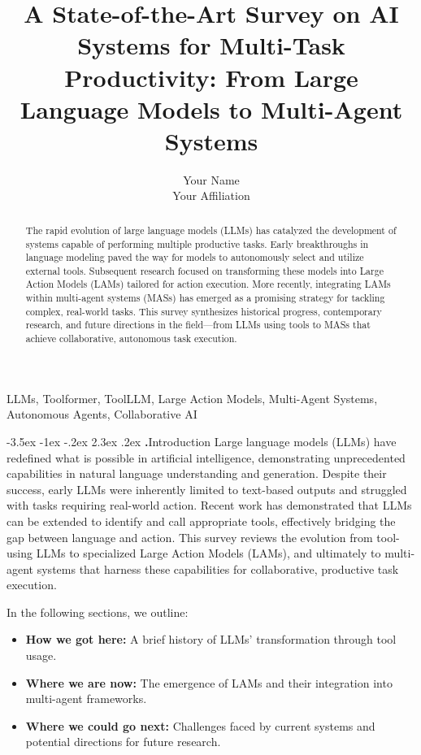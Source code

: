 \documentclass[journal,twoside,10pt]{IEEEtran}
\makeatletter
\renewcommand\section{\@startsection{section}{1}{\z@}%
                       {-3.5ex \@plus -1ex \@minus -.2ex}%
                       {2.3ex \@plus.2ex}%
                       {\normalfont\Large\bfseries\Roman{section}.\quad}}
\makeatother
\begin{document}
\title{A State-of-the-Art Survey on AI Systems for Multi-Task Productivity: From Large Language Models to Multi-Agent Systems}

\author{Your Name \\ Your Affiliation}

\maketitle

\begin{abstract}
The rapid evolution of large language models (LLMs) has catalyzed the development of systems capable of performing multiple productive tasks. Early breakthroughs in language modeling paved the way for models to autonomously select and utilize external tools. Subsequent research focused on transforming these models into Large Action Models (LAMs) tailored for action execution. More recently, integrating LAMs within multi-agent systems (MASs) has emerged as a promising strategy for tackling complex, real-world tasks. This survey synthesizes historical progress, contemporary research, and future directions in the field—from LLMs using tools to MASs that achieve collaborative, autonomous task execution.
\end{abstract}

\begin{IEEEkeywords}
LLMs, Toolformer, ToolLLM, Large Action Models, Multi-Agent Systems, Autonomous Agents, Collaborative AI
\end{IEEEkeywords}

\section{Introduction}
Large language models (LLMs) have redefined what is possible in artificial intelligence, demonstrating unprecedented capabilities in natural language understanding and generation. Despite their success, early LLMs were inherently limited to text-based outputs and struggled with tasks requiring real-world action. Recent work has demonstrated that LLMs can be extended to identify and call appropriate tools, effectively bridging the gap between language and action. This survey reviews the evolution from tool-using LLMs to specialized Large Action Models (LAMs), and ultimately to multi-agent systems that harness these capabilities for collaborative, productive task execution.

In the following sections, we outline:
\begin{itemize}
    \item \textbf{How we got here:} A brief history of LLMs' transformation through tool usage.
    \item \textbf{Where we are now:} The emergence of LAMs and their integration into multi-agent frameworks.
    \item \textbf{Where we could go next:} Challenges faced by current systems and potential directions for future research.
\end{itemize}
\end{document}
